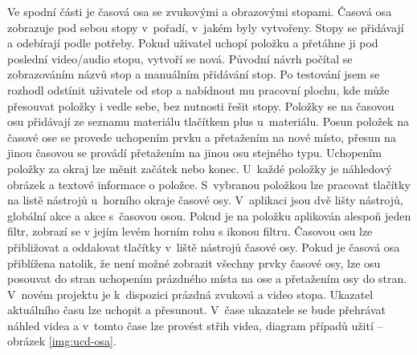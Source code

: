 Ve spodní části je časová osa se zvukovými a obrazovými stopami. Časová osa zobrazuje pod sebou stopy v~pořadí, v~jakém byly vytvořeny. Stopy se přidávají a odebírají podle potřeby. Pokud uživatel uchopí položku a přetáhne ji pod poslední video/audio stopu, vytvoří se nová. Původní návrh počítal se zobrazováním názvů stop a manuálním přidávání stop. Po testování jsem se rozhodl odstínit uživatele od stop a nabídnout mu pracovní plochu, kde může přesouvat položky i vedle sebe, bez nutnosti řešit stopy. Položky se na časovou osu přidávají ze seznamu materiálu tlačítkem plus u~materiálu. Posun položek na časové ose se provede uchopením prvku a přetažením na nové místo, přesun na jinou časovou se provádí přetažením na jinou osu stejného typu. Uchopením položky za okraj lze měnit začátek nebo konec. U~každé položky je náhledový obrázek a textové informace o položce. S~vybranou položkou lze pracovat tlačítky na listě nástrojů u~horního okraje časové osy. V~aplikaci jsou dvě lišty nástrojů, globální akce a akce s~časovou osou. Pokud je na položku aplikován alespoň jeden filtr, zobrazí se v jejím levém horním rohu  s ikonou filtru. Časovou osu lze přibližovat a oddalovat tlačítky v~liště nástrojů časové osy. Pokud je časová osa přiblížena natolik, že není možné zobrazit všechny prvky časové osy, lze osu posouvat do stran uchopením prázdného místa na ose a přetažením osy do stran. V~novém projektu je k~dispozici prázdná zvuková a video stopa. Ukazatel aktuálního času lze uchopit a přesunout. V~čase ukazatele se bude přehrávat náhled videa a v~tomto čase lze provést střih videa, diagram případů užití -- obrázek \ref{img:ucd-osa}.
